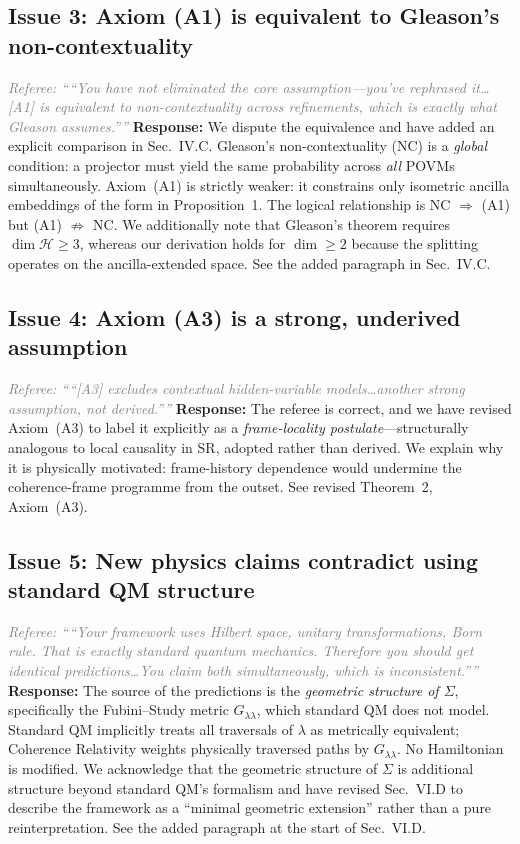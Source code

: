 \documentclass[12pt]{article}
\newcommand{\referee}[1]{\medskip\noindent\textcolor{gray}{\textit{Referee: ``#1''}}\medskip}
\newcommand{\response}[1]{\noindent\textbf{Response:} #1\medskip}
\begin{document}
\subsection*{Issue 3: Axiom (A1) is equivalent to Gleason's non-contextuality}
\referee{``You have not eliminated the core assumption---you've rephrased it\ldots
[A1] is equivalent to non-contextuality across refinements, which is exactly what
Gleason assumes.''}
\response{We dispute the equivalence and have added an explicit comparison in
Sec.~IV.C. Gleason's non-contextuality (NC) is a \emph{global} condition: a
projector must yield the same probability across \emph{all} POVMs simultaneously.
Axiom~(A1) is strictly weaker: it constrains only isometric ancilla embeddings of
the form in Proposition~1. The logical relationship is NC $\Rightarrow$ (A1) but
(A1) $\not\Rightarrow$ NC. We additionally note that Gleason's theorem requires
$\dim\mathcal{H}\geq 3$, whereas our derivation holds for $\dim\geq 2$ because the
splitting operates on the ancilla-extended space. See the added paragraph in
Sec.~IV.C.}

\subsection*{Issue 4: Axiom (A3) is a strong, underived assumption}
\referee{``[A3] excludes contextual hidden-variable models\ldots another strong
assumption, not derived.''}
\response{The referee is correct, and we have revised Axiom~(A3) to label it
explicitly as a \emph{frame-locality postulate}---structurally analogous to local
causality in SR, adopted rather than derived. We explain why it is physically
motivated: frame-history dependence would undermine the coherence-frame programme
from the outset. See revised Theorem~2, Axiom~(A3).}

\subsection*{Issue 5: New physics claims contradict using standard QM structure}
\referee{``Your framework uses Hilbert space, unitary transformations, Born rule.
That is exactly standard quantum mechanics. Therefore you should get identical
predictions\ldots You claim both simultaneously, which is inconsistent.''}
\response{The source of the predictions is the \emph{geometric structure of $\Sigma$},
specifically the Fubini--Study metric $G_{\lambda\lambda}$, which standard QM does not
model. Standard QM implicitly treats all traversals of $\lambda$ as metrically
equivalent; Coherence Relativity weights physically traversed paths by
$G_{\lambda\lambda}$. No Hamiltonian is modified. We acknowledge that the geometric
structure of $\Sigma$ is additional structure beyond standard QM's formalism and have
revised Sec.~VI.D to describe the framework as a ``minimal geometric extension''
rather than a pure reinterpretation. See the added paragraph at the start of
Sec.~VI.D.}
\end{document}
